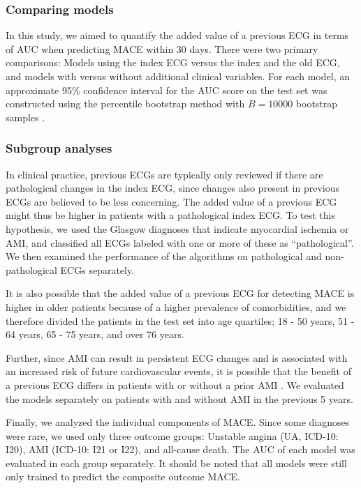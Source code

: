 \documentclass[preprint]{elsarticle}
\begin{document}
\subsubsection{Comparing models}
In this study, we aimed to quantify the added value of a previous ECG in terms of AUC  when predicting MACE within 30 days. There were two primary comparisons: Models using the index ECG versus the index and the old ECG, and models with versus without additional clinical variables. For each model, an approximate 95\% confidence interval for the AUC score on the test set was constructed using the percentile bootstrap method with $B=10000$ bootstrap samples \citep{efron1981}.

\subsubsection{Subgroup analyses}
In clinical practice, previous ECGs are typically only reviewed if there are pathological changes in the index ECG, since changes also present in previous ECGs are believed to be less concerning. The added value of a previous ECG might thus be higher in patients with a pathological index ECG. To test this hypothesis, we used the Glasgow diagnoses that indicate myocardial ischemia or AMI, and classified all ECGs labeled with one or more of these as ``pathological''. We then examined the performance of the algorithms on pathological and non-pathological ECGs separately.

It is also possible that the added value of a previous ECG for detecting MACE is higher in older patients because of a higher prevalence of comorbidities, and we therefore divided the patients in the test set into age quartiles; 18 - 50 years, 51 - 64 years, 65 - 75 years, and over 76 years.

Further, since AMI can result in persistent ECG changes and is associated with an increased risk of future cardiovascular events, it is possible that the benefit of a previous ECG differs in patients with or without a prior AMI \citep{strom2007,sawai2017}. We evaluated the models separately on patients with and without AMI in the previous 5 years.

Finally, we analyzed the individual components of MACE. Since some diagnoses were rare, we used only three outcome groups: Unstable angina (UA, ICD-10: I20), AMI (ICD-10: I21 or I22), and all-cause death. The AUC of each model was evaluated in each group separately. It should be noted that all models were still only trained to predict the composite outcome MACE.
\end{document}
